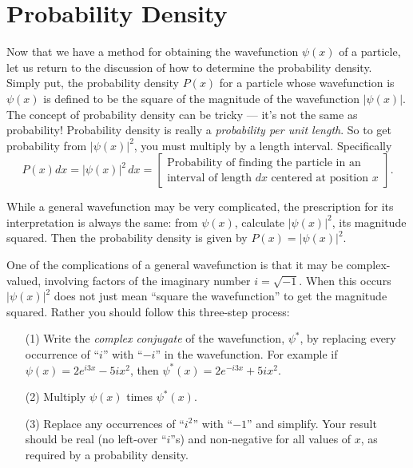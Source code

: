 \section{Probability Density}
\label{sec:ProbDensity}

Now that we have a method for obtaining the wavefunction $\psi(x)$ of
a particle, let us return to the discussion of how to determine the
probability density.  Simply put, the probability density $P(x)$ for a
particle whose wavefunction is $\psi(x)$ is defined to be the square 
of the magnitude of the wavefunction $|\psi(x)|$.  The concept of
probability density can be tricky --- it's not the same as
probability!  Probability density is really a {\em probability per
  unit length}. So to get probability from $|\psi(x)|^2$, you must
multiply by a length interval. Specifically
\begin{equation}
\label{eq:probDensity}
P(x) dx = |\psi(x)|^2\, dx = \left[ \begin{array}{l}
         \mbox{Probability of finding the particle in an} \\
         \mbox{interval of length $dx$ centered at position $x$}
                    \end{array} \right] .
\end{equation}

While a general wavefunction may be very complicated, the prescription
for its interpretation is always the same: from $\psi(x)$, calculate
$|\psi(x)|^2$, its magnitude squared.  Then the probability density is
given by $P(x)=|\psi(x)|^2$.

One of the complications of a general wavefunction is that it may be
complex-valued, involving factors of the imaginary number $ i = \sqrt{-1}$.  
When this occurs $|\psi(x)|^2$ does not just mean ``square the wavefunction''
to get the magnitude squared.  Rather you should follow this three-step
process:

\begin{enumerate}

\item[(1)] Write the {\em complex conjugate} of the wavefunction, $\psi^*$,
  by replacing every occurrence of ``$i$'' with ``$-i$'' in the
  wavefunction.  For example if $\psi(x) = 2 e^{i3x} - 5 i x^2$, then
  $\psi^*(x) = 2 e^{-i3x} + 5 i x^2$.

\item[(2)] Multiply $\psi(x)$ times $\psi^*(x)$.

\item[(3)] Replace any occurrences of ``$i^2$'' with ``$-1$'' and
  simplify. Your result should be real (no left-over ``$i$''s) and
  non-negative for all values of $x$, as required by a probability
  density.

\end{enumerate}

